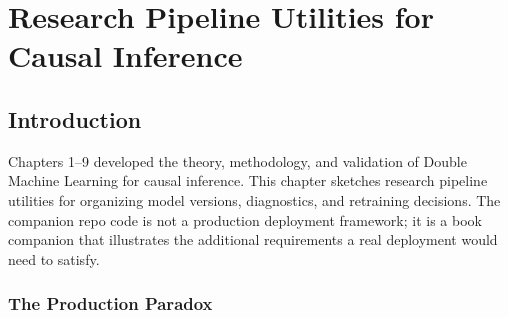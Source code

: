 
\chapter{Research Pipeline Utilities for Causal Inference}
\label{ch:production}

\section{Introduction}\label{sec:ch10_introduction}

Chapters 1--9 developed the theory, methodology, and validation of Double Machine Learning for causal inference. This chapter sketches research pipeline utilities for organizing model versions, diagnostics, and retraining decisions. The companion repo code is not a production deployment framework; it is a book companion that illustrates the additional requirements a real deployment would need to satisfy.


\subsection{The Production Paradox}


